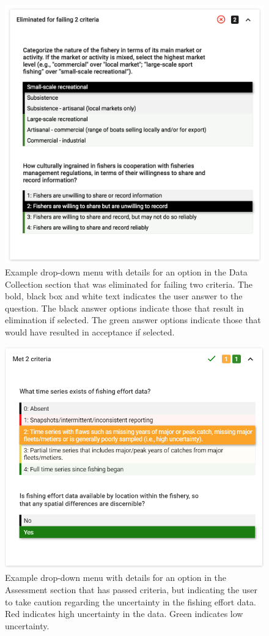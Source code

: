 \documentclass[11pt,]{book}
\begin{document}
\begin{figure}

{\centering \includegraphics[width=0.75\linewidth]{images/crit-drop-down} 

}

\caption{Example drop-down menu with details for an option in the Data Collection section that was eliminated for failing two criteria. The bold, black box and white text indicates the user answer to the question. The black answer options indicate those that result in elimination if selected. The green answer options indicate those that would have resulted in acceptance if selected.}\label{fig:crit-drop-down}
\end{figure}

\begin{figure}

{\centering \includegraphics[width=0.75\linewidth]{images/assessment-crit-drop-down} 

}

\caption{Example drop-down menu with details for an option in the Assessment section that has passed criteria, but indicating the user to take caution regarding the uncertainty in the fishing effort data. Red indicates high uncertainty in the data. Green indicates low uncertainty.}\label{fig:assessment-crit-drop-down}
\end{figure}
\end{document}
